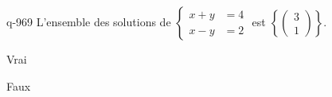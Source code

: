 \begin{truefalse}{q-969}
L'ensemble des solutions de $\begin{cases} x+y &= 4 \\ x-y &= 2 \end{cases}$ est $\left\{\begin{pmatrix}3\\1\end{pmatrix}\right\}$.
\item* Vrai
\item Faux
\end{truefalse}

